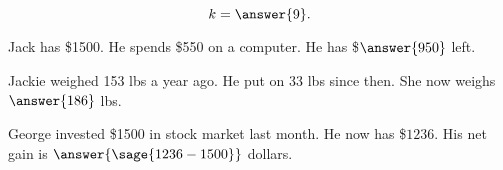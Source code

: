 \documentclass{ximera}
\begin{document}
\begin{problem}

\begin{image}
\end{image}

$$k=\answer{9}.$$
\end{problem}

\begin{problem}
Jack has \$1500. He spends \$550 on a computer. He has \$$\answer{950}$ left.
\end{problem}


\begin{problem}
Jackie weighed 153 lbs a year ago. He put on 33 lbs since then. She now weighs $\answer{186}$ lbs.
\end{problem}


\begin{problem}
George invested \$1500 in stock market last month. He now has \$$1236$. His net gain is $\answer{\sage{1236-1500}}$ dollars.
\end{problem}

\end{document}

